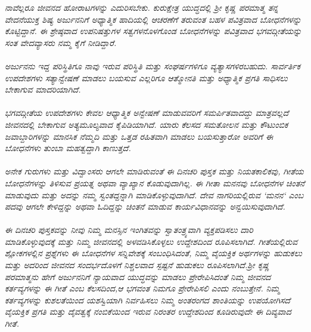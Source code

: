 \textit{\indent ನಾವೆಲ್ಲರೂ ಜೀವನದ ಹೋರಾಟಗಳನ್ನು ಎದುರಿಸಬೇಕು. ಕುರುಕ್ಷೇತ್ರ ಯುದ್ಧದಲ್ಲಿ ಶ್ರೀ ಕೃಷ್ಣ ಪರಮಾತ್ಮ ತನ್ನ ವೇದನೆಯುಕ್ತ ಶಿಷ್ಯ ಅರ್ಜುನನಿಗೆ ಅಧ್ಯಾತ್ಮಿಕ ಹಾದಿಯಲ್ಲಿ ಆಚರಣೆಗೆ ತರುವಂತ ಬಹಳ ಪವಿತ್ರವಾದ ಬೋಧನೆಗಳನ್ನು ಕೊಟ್ಟಿದ್ದಾನೆ. ಈ ಶ್ರೇಷ್ಠವಾದ ಉಪನಿಷತ್ತುಗಳ ಸತ್ವಗಳನೊಳಗೊಂಡ  ಬೋಧನೆಗಳನ್ನು ಪವಿತ್ರವಾದ ಭಗವದ್ಗೀತೆಯನ್ನು ಸಂತ ವೇದವ್ಯಾಸರು ನಮ್ಮ ಕೈಗೆ ನೀಡಿದ್ದಾರೆ.\\
\\
 ಅರ್ಜುನನು ಇದ್ದ ಪರಿಸ್ಥಿತಿಗೂ ನಾವು ಇರುವ ಪರಿಸ್ಥಿತಿ ಮತ್ತು ಸಂಘರ್ಷಗಳಿಗೂ ವ್ಯತ್ಯಾಸಗಳಿರಬಹುದು. ಸಾರ್ವರ್ತಿಕ ಉಪದೇಶಗಳು ಸತ್ಯಾನ್ವೇಷಣೆ ಮಾಡಲು ಬಯಸುವ ಎಲ್ಲರಿಗೂ ಆತ್ಮೋನತಿ  ಮತ್ತು ಅಧ್ಯಾತ್ಮಿಕ ಪ್ರಗತಿ ಸಾಧಿಸಲು ಬೇಕಾಗುವ ಮಾದರಿಯಾಗಿದೆ.\\
\\
 ಭಗವದ್ಗೀತೆಯ ಉಪದೇಶಗಳು ಕೇವಲ ಆಧ್ಯಾತ್ಮಿಕ ಅನ್ವೇಷಣೆ ಮಾಡುವವರಿಗೆ ಸಮರ್ಪಿತವಾದದ್ದು ಮಾತ್ರವಲ್ಲದೆ ಜೀವನದಲ್ಲಿ ಬೇಕಾಗುವ ಅತ್ಯಮೂಲ್ಯವಾದ ಕೈಪಿಡಿಯಾಗಿದೆ. ಯಾರು ಕೆಲಸದ ಸಮತೋಲನ ಮತ್ತು ಕೌಟುಂಬಿಕ ಜವಾಬ್ದಾರಿಗಳನ್ನು ಮಾನಸಿಕ ನೆಮ್ಮದಿ ಮತ್ತು ಒತ್ತಡ ರಹಿತವಾಗಿ ಮಾಡಲು ಬಯಸುತ್ತಾರೋ ಅವರಿಗೆ ಈ ಬೋಧನೆಗಳು ತುಂಬಾ ಮಹತ್ವದ್ದಾಗಿ ಕಾಣುತ್ತದೆ.\\
\\
 ಅನೇಕ ಗುರುಗಳು ಮತ್ತು ವಿದ್ವಾಂಸರು ಆಗಲೇ ಮಾಡಿರುವಂತೆ ಈ ದಿನಚರಿ ಪುಸ್ತಕ ಮತ್ತು ನಿಯತಕಾಲಿಕವು, ಗೀತೆಯ ಬೋಧನೆಗಳನ್ನು ತಿಳಿಸುವ ಪ್ರಯತ್ನ ಅಥವಾ ವ್ಯಾಖ್ಯಾನ ಕೊಡುವುದಾಗಿಲ್ಲ. ಈ ಗೀತಾ ಮನನವು ಬೋಧನೆಗಳ ಚಿಂತನೆ ಮಾಡುವುದು ಮತ್ತು ಅದನ್ನು ನಮ್ಮ ಸ್ವಂತದ್ದನ್ನಾಗಿ ಮಾಡಿಕೊಳ್ಳುವುದಾಗಿದೆ. ದೇವ ನಾಗರಿಯಲ್ಲಿರುವ `ಮನನ` ಎಂಬ ಪದವು ಆಗಲೇ ಕೇಳಿದ್ದನ್ನು ಅಥವಾ ಓದಿದ್ದನ್ನು ಚಿಂತನೆ ಮಾಡುವ ಕಾರ್ಯವಿಧಾನವನ್ನು ಅನ್ವಯಿಸುವುದಾಗಿದೆ.\\
\\
 ಈ ದಿನಚರಿ ಪುಸ್ತಕವನ್ನು ನೀವು ನಿಮ್ಮ ಮನಸ್ಸಿನ ಇಂಗಿತವನ್ನು ಸ್ವಾತಂತ್ರ್ಯವಾಗಿ ವ್ಯಕ್ತಪಡಿಸಲು ದಾರಿ ಮಾಡಿಕೊಳ್ಳುವುದಕ್ಕೆ ಮತ್ತು ನಿಮ್ಮ ಜೀವನದಲ್ಲಿ ಅಳವಡಿಸಿಕೊಳ್ಳಲು ಉದ್ದೇಶದಿಂದ ರೂಪಿಸಲಾಗಿದೆ. ಗೀತೆಯಲ್ಲಿರುವ ಶ್ಲೋಕಗಳಲ್ಲಿನ ಪ್ರಶ್ನೆಗಳು ಈ ಬೋಧನೆಗಳ ಸನ್ನಿವೇಶಕ್ಕೆ ಸಂಬಂಧಿಸಿದಂತೆ, ನಿಮ್ಮ ವೈಯಕ್ತಿಕ ಅರ್ಥಗಳನ್ನು ಹುಡುಕಲು ಮತ್ತು ಅದರಿಂದ ಜೀವನದ ಸಂದರ್ಭದೊಳಗೆ ನಿಶ್ಚಲವಾದ ಸ್ಪಷ್ಟನೆ ಹುಡುಕಲು ರೂಪಿಸಲಾಗಿದೆ.ಶ್ರೀ ಕೃಷ್ಣ ಪರಮಾತ್ಮನು ಹೇಗೆ ಅರ್ಜುನನಿಗೆ ನ್ಯಾಯವಾದ ಯುದ್ಧವನ್ನು ಮಾಡಲು ಪ್ರೇರೇಪಿಸಿದಂತೆ ನಿಮ್ಮ ಜೀವನದ ಕರ್ತವ್ಯಗಳನ್ನು ಈ ಗೀತೆ ಎಂಬ ಕೆಲಸದಿಂದ,ಆ ಭಗವಂತ ನಿಮಗೂ ಪ್ರೇರೇಪಿಸಲಿ ಎಂದು ನಂಬುತ್ತೇನೆ. ನಿಮ್ಮ ಕರ್ತವ್ಯಗಳನ್ನು ಕುಶಲತೆಯಿಂದ ಯಶಸ್ವಿಯಾಗಿ ನಿರ್ವಹಿಸಲು ನಿಮ್ಮ ಅಂತರಂಗದ ಶಾಂತಿಯನ್ನು ಉಪಯೋಗಿಸದೆ ವೈಯಕ್ತಿಕ ಪ್ರಗತಿ ಮತ್ತು ದೈವತ್ವಕ್ಕೆ ನಂಬಿಕೆಯಿಂದ ಇರುವ ನಿರಂತರ ಉದ್ದೇಶದಿಂದ ಕೂಡಿರುವುದೇ ಈ ದಿವ್ಯವಾದ ಗೀತೆ.}
